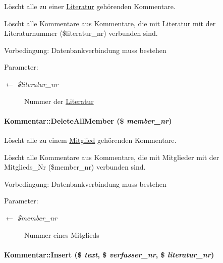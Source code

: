 Löscht alle zu einer \hyperlink{classLiteratur}{Literatur} gehörenden Kommentare. 

Löscht alle Kommentare aus Kommentare, die mit \hyperlink{classLiteratur}{Literatur} mit der Literaturnummer (\$literatur\_\-nr) verbunden sind. \begin{Desc}
\item[Vorbedingung:]Datenbankverbindung muss bestehen \end{Desc}
\begin{Desc}
\item[Parameter:]
\begin{description}
\item[\mbox{$\leftarrow$} {\em \$literatur\_\-nr}]Nummer der \hyperlink{classLiteratur}{Literatur}\end{description}
\end{Desc}
\hypertarget{classKommentar_92a8fcea1b065341c7c53e8a8464fcf0}{
\paragraph[DeleteAllMember]{\setlength{\rightskip}{0pt plus 5cm}Kommentar::Delete\-All\-Member (\$ {\em member\_\-nr})}\hfill}
\label{classKommentar_92a8fcea1b065341c7c53e8a8464fcf0}


Löscht alle zu einem \hyperlink{classMitglied}{Mitglied} gehörenden Kommentare. 

Löscht alle Kommentare aus Kommentare, die mit Mitglieder mit der Mitglieds\_\-Nr (\$member\_\-nr) verbunden sind. \begin{Desc}
\item[Vorbedingung:]Datenbankverbindung muss bestehen \end{Desc}
\begin{Desc}
\item[Parameter:]
\begin{description}
\item[\mbox{$\leftarrow$} {\em \$member\_\-nr}]Nummer eines Mitglieds\end{description}
\end{Desc}
\hypertarget{classKommentar_6119b3c12a61d8d5a41cded165517914}{
\paragraph[Insert]{\setlength{\rightskip}{0pt plus 5cm}Kommentar::Insert (\$ {\em text}, \$ {\em verfasser\_\-nr}, \$ {\em literatur\_\-nr})}\hfill}
\label{classKommentar_6119b3c12a61d8d5a41cded165517914}


